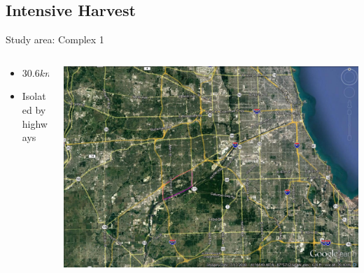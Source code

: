 \documentclass{beamer}
\begin{document}
\subsection{Intensive Harvest}
\begin{frame}{Study area: Complex 1}
\begin{columns}
	\begin{column}{0.3\textwidth}
		\begin{itemize}
			\item $30.6 km^2$ 
			\item Isolated by highways
		\end{itemize}
	\end{column}
	\begin{column}{0.7\textwidth}
		\begin{center}
			\includegraphics[width=\textwidth]{fig/Chicago_deer/Complex1.jpg} %
		\end{center}
	\end{column}
\end{columns}
\end{frame}
\end{document}
